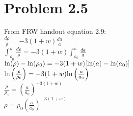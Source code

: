 \documentclass[11pt, oneside, doublespacing]{article}   	%
\begin{document}
\section*{Problem 2.5}
\noindent From FRW handout equation 2.9: \\
$\frac{d\rho}{\rho} = -3(1+w)\frac{da}{a}$ \\
$\int_{\rho_{0}}^{\rho} \frac{d\rho}{\rho} = -3(1+w)\int_{a_{0}}^{a} \frac{da}{a}$ \\
${\rm ln}(\rho) - {\rm ln}(\rho_{0}) = -3(1+w)[{\rm ln}(a) - {\rm ln}(a_{0})]$ \\
${\rm ln}\left(\frac{\rho}{\rho_0}\right) = -3(1+w){\rm ln}\left(\frac{a}{a_0}\right)$ \\
$\frac{\rho}{\rho_0} = \left(\frac{a}{a_0}\right)^{-3(1+w)} $ \\
$\rho = \rho_{0} \left( \frac{a}{a_{0}}\right) ^{-3(1+w)} $ \\
\end{document}
